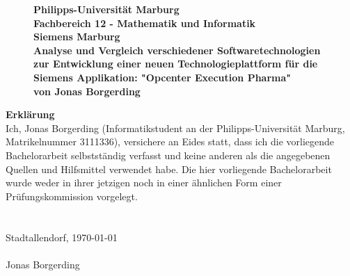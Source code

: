 \documentclass[ngerman]{article}
\begin{document}
    \sloppy
    \pagestyle{empty}
    \begin{figure}
        \begin{center}
            {\huge\textbf{Philipps-Universität Marburg}}\\
            \vspace{.2cm}
            {\small \textbf{Fachbereich 12 - Mathematik und Informatik}}\\\vspace{.5cm}
            \vspace{.2cm}
            {\huge\textbf{Siemens Marburg}}\\
            \vspace{1.5cm}
            {\LARGE\textbf{Analyse und Vergleich verschiedener Softwaretechnologien zur Entwicklung einer neuen Technologieplattform für die Siemens Applikation: "Opcenter Execution Pharma"}}\\
            \vspace{.5cm}
            \textbf{von Jonas Borgerding}
        \end{center}
    \end{figure}
    \clearpage
    \noindent
    \textbf{Erklärung}\\
    Ich, Jonas Borgerding (Informatikstudent an der Philipps-Universität Marburg, Matrikelnummer 3111336), versichere an Eides statt, dass ich die vorliegende Bachelorarbeit selbstständig verfasst und keine anderen als die angegebenen Quellen und Hilfsmittel verwendet habe. Die hier vorliegende Bachelorarbeit wurde weder in ihrer jetzigen noch in einer ähnlichen Form einer Prüfungskommission vorgelegt.\\\\\\
    Stadtallendorf, \today\\\\
    Jonas Borgerding\newpage
\end{document}
